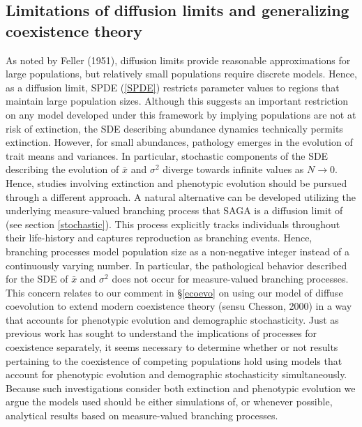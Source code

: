 \documentclass[]{elsarticle} %
\begin{document}
\hypertarget{limitations-of-diffusion-limits-and-generalizing-coexistence-theory}{%
\subsection{Limitations of diffusion limits and generalizing coexistence
theory}\label{limitations-of-diffusion-limits-and-generalizing-coexistence-theory}}

As noted by Feller (1951), diffusion limits provide reasonable
approximations for large populations, but relatively small populations
require discrete models. Hence, as a diffusion limit, SPDE (\ref{SPDE})
restricts parameter values to regions that maintain large population
sizes. Although this suggests an important restriction on any model
developed under this framework by implying populations are not at risk
of extinction, the SDE describing abundance dynamics technically permits
extinction. However, for small abundances, pathology emerges in the
evolution of trait means and variances. In particular, stochastic
components of the SDE describing the evolution of \(\bar x\) and
\(\sigma^2\) diverge towards infinite values as \(N\to0\). Hence,
studies involving extinction and phenotypic evolution should be pursued
through a different approach. A natural alternative can be developed
utilizing the underlying measure-valued branching process that SAGA is a
diffusion limit of (see section \ref{stochastic}). This process
explicitly tracks individuals throughout their life-history and captures
reproduction as branching events. Hence, branching processes model
population size as a non-negative integer instead of a continuously
varying number. In particular, the pathological behavior described for
the SDE of \(\bar x\) and \(\sigma^2\) does not occur for measure-valued
branching processes. This concern relates to our comment in
\S\ref{ecoevo} on using our model of diffuse coevolution to extend
modern coexistence theory (sensu Chesson, 2000) in a way that accounts
for phenotypic evolution and demographic stochasticity. Just as previous
work has sought to understand the implications of processes for
coexistence separately, it seems necessary to determine whether or not
results pertaining to the coexistence of competing populations hold
using models that account for phenotypic evolution and demographic
stochasticity simultaneously. Because such investigations consider both
extinction and phenotypic evolution we argue the models used should be
either simulations of, or whenever possible, analytical results based on
measure-valued branching processes.
\end{document}
